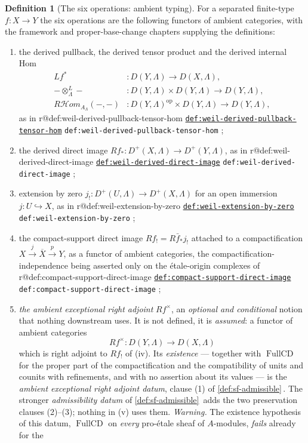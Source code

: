 \documentclass[11pt]{article}
\makeatletter
\theoremstyle{plain}
\theoremstyle{definition}
\newtheorem{definition}[theorem]{Definition}
\newcommand{\up}[1]{%
  \ifcsname r@#1\endcsname
    \hyperref[#1]{\texttt{\scriptsize #1}}%
  \else
    \texttt{\scriptsize #1}%
  \fi}
\newcommand{\Cref}[1]{\hyperref[#1]{\ref{#1}}\,\hyperref[#1]{\nameref*{#1}}}
\newcommand{\RHom}{R\mathcal Hom_A}
\makeatother
\begin{document}
\begin{definition}[The six operations: ambient typing]
\label{def:sf-operations}
For a separated finite-type $f:X\to Y$ the six operations are the following
functors of ambient categories, with the framework and proper-base-change
chapters supplying the definitions:
\begin{enumerate}\itemsep3pt
\item[(i)] the derived pullback, the derived tensor product and the derived
internal Hom
\[
\begin{aligned}
Lf^*&:D(Y,\Lambda)\longrightarrow D(X,\Lambda),\\
-\otimes^L_\Lambda-&:D(Y,\Lambda)\times D(Y,\Lambda)\longrightarrow D(Y,\Lambda),\\
\RHom_\Lambda(-,-)&:D(Y,\Lambda)^{\mathrm{op}}\times D(Y,\Lambda)\longrightarrow D(Y,\Lambda),
\end{aligned}
\]
as in \up{def:weil-derived-pullback-tensor-hom};
\item[(ii)] the derived direct image
$Rf_*:D^+(X,\Lambda)\to D^+(Y,\Lambda)$, as in
\up{def:weil-derived-direct-image};
\item[(iii)] extension by zero $j_!:D^+(U,\Lambda)\to D^+(X,\Lambda)$ for an
open immersion $j:U\hookrightarrow X$, as in \up{def:weil-extension-by-zero};
\item[(iv)] the compact-support direct image $Rf_!=R\bar f_*j_!$ attached to a
compactification $X\xrightarrow{j}\overline X\xrightarrow{p}Y$, as a functor of
ambient categories, the compactification-independence being asserted only on
the \'etale-origin complexes of \up{def:compact-support-direct-image};
\item[(v)] \emph{the ambient exceptional right adjoint} $Rf^{\times}$, an
\emph{optional and conditional} notion that nothing downstream uses.  It is
not defined, it is \emph{assumed}: a functor of ambient categories
\[
Rf^{\times}:D(Y,\Lambda)\longrightarrow D(X,\Lambda)
\]
which is right adjoint to $Rf_!$ of (iv).  Its \emph{existence} --- together
with $\operatorname{FullCD}$ for the proper part of the compactification and
the compatibility of units and counits with refinements, and with no
assertion about its values --- is the \emph{ambient exceptional right adjoint
datum}, clause (1) of \Cref{def:sf-admissible}.  The stronger
\emph{admissibility datum} of \Cref{def:sf-admissible} adds the two
preservation clauses (2)--(3); nothing in (v) uses them.  \emph{Warning.}
The existence hypothesis of this datum, $\operatorname{FullCD}$ on
\emph{every} pro-\'etale sheaf of $A$-modules, \emph{fails} already for the

\end{enumerate}
\end{definition}
\end{document}
